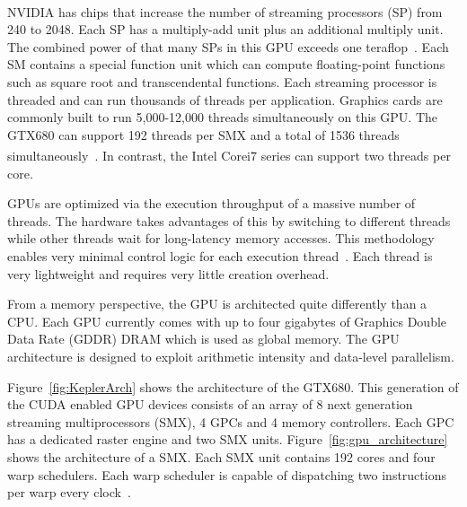 NVIDIA\textsuperscript{\textregistered} has chips that increase the
number of streaming processors (SP) from 240 to 2048. Each SP has a
multiply-add unit plus an additional multiply unit.  The combined
power of that many SPs in this GPU exceeds one
teraflop~\cite{Kirk:2010:PMP:1841511}.  Each SM contains a special function
unit which can compute floating-point functions such as square root
and transcendental functions.  Each streaming processor is threaded and
can run thousands of threads per application.  Graphics cards are
commonly built to run 5,000-12,000 threads simultaneously on this GPU.
The GTX680 can support 192 threads per SMX and a total of 1536 threads
 simultaneously~\cite{nvidia:12:gtx680tech}. In contrast, the
Intel\textsuperscript{\textregistered} Core\texttrademark i7 series
can support two threads per core.

GPUs are optimized via the execution throughput of a massive number of threads.
The hardware takes advantages of this by switching to different threads while 
other threads wait for long-latency memory accesses.  This methodology enables
very minimal control logic for each execution thread~\cite{Kirk:2010:PMP:1841511}.
Each thread is very lightweight and requires very little creation overhead.

From a memory perspective, the GPU is architected quite differently
than a CPU.  Each GPU currently comes with up to four gigabytes of
Graphics Double Data Rate (GDDR) DRAM which is used as global
memory. The GPU architecture is designed to exploit arithmetic
intensity and data-level parallelism.

Figure~\ref{fig:KeplerArch} shows the architecture of the GTX680.
This generation of the CUDA enabled GPU devices consists of an array of 8 
next generation streaming multiprocessors (SMX), 4 GPCs and 4 memory controllers.
Each GPC has a dedicated raster engine and two SMX units.
Figure~\ref{fig:gpu_architecture} shows the architecture of a SMX. 
Each SMX unit contains 192 cores and four warp schedulers. 
Each warp scheduler is capable of dispatching two instructions per warp every clock~\cite{nvidia:12:gtx680tech}.


